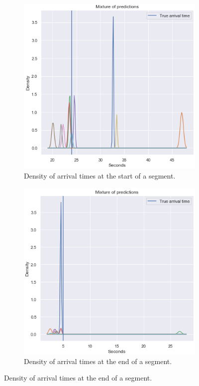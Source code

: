 \begin{figure}[H]
    \caption{Density comparison}
  \begin{subfigure}[b]{0.5\textwidth}
    \includegraphics[width=\textwidth]{figures/mixture-start-of-traj.png}
    \caption{Density of arrival times at the start of a segment.}
    \label{fig:mixture-start-of-traj}
  \end{subfigure}
  \begin{subfigure}[b]{0.5\textwidth}
    \includegraphics[width=\textwidth]{figures/mixture-end-of-traj.png}
    \caption{Density of arrival times at the end of a segment.}
    \label{fig:mixture-end-of-traj}
  \end{subfigure}
\end{figure}
